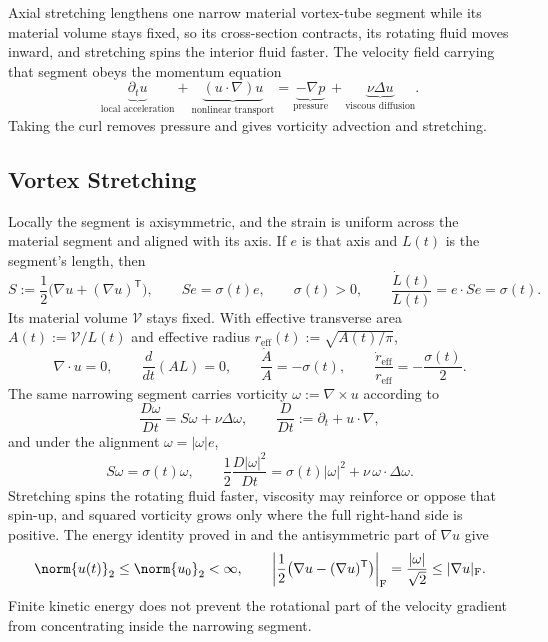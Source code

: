 
Axial stretching lengthens one narrow material vortex-tube segment while its material volume stays fixed, so its cross-section contracts, its rotating fluid moves inward, and stretching spins the interior fluid faster. The velocity field carrying that segment obeys the momentum equation
\[
  \underbrace{\partial_t u}_{\text{local acceleration}}
  +
  \underbrace{(u\cdot\nabla)u}_{\text{nonlinear transport}}
  =
  \underbrace{-\nabla p}_{\text{pressure}}
  +
  \underbrace{\nu\Delta u}_{\text{viscous diffusion}}.
\]
Taking the curl removes pressure and gives vorticity advection and stretching.

\subsection{Vortex Stretching}\label{sub:ThePerfectlyStretchingVortex}

Locally the segment is axisymmetric, and the strain is uniform across the material segment and aligned with its axis. If \(e\) is that axis and \(L(t)\) is the segment's length, then
\[
  S:=\frac12\bigl(\nabla u+(\nabla u)^{\mathsf T}\bigr),
  \qquad
  Se=\sigma(t)e,
  \qquad
  \sigma(t)>0,
  \qquad
  \frac{\dot L(t)}{L(t)}
  =
  e\cdot Se
  =
  \sigma(t).
\]
Its material volume \(\mathcal V\) stays fixed. With effective transverse area \(A(t):=\mathcal V/L(t)\) and effective radius \(r_{\mathrm{eff}}(t):=\sqrt{A(t)/\pi}\),
\[
  \nabla\cdot u=0,
  \qquad
  \frac{d}{dt}(A L)=0,
  \qquad
  \frac{\dot A}{A}=-\sigma(t),
  \qquad
  \frac{\dot r_{\mathrm{eff}}}{r_{\mathrm{eff}}}
  =
  -\frac{\sigma(t)}{2}.
\]
The same narrowing segment carries vorticity \(\omega:=\nabla\times u\) according to
\[
  \frac{D\omega}{Dt}
  =
  S\omega+\nu\Delta\omega,
  \qquad
  \frac{D}{Dt}
  :=
  \partial_t+u\cdot\nabla,
\]
and under the alignment \(\omega=|\omega|e\),
\[
  S\omega
  =
  \sigma(t)\omega,
  \qquad
  \frac12\frac{D|\omega|^2}{Dt}
  =
  \sigma(t)|\omega|^2
  +
  \nu\,\omega\cdot\Delta\omega.
\]
Stretching spins the rotating fluid faster, viscosity may reinforce or oppose that spin-up, and squared vorticity grows only where the full right-hand side is positive. The energy identity proved in  and the antisymmetric part of \(\nabla u\) give
\[
  \norm{u(t)}_2
  \leq
  \norm{u_0}_2
  <\infty,
  \qquad
  \left|\frac12\bigl(\nabla u-(\nabla u)^{\mathsf T}\bigr)\right|_{\mathrm F}
  =
  \frac{|\omega|}{\sqrt2}
  \leq
  |\nabla u|_{\mathrm F}.
\]
Finite kinetic energy does not prevent the rotational part of the velocity gradient from concentrating inside the narrowing segment.

